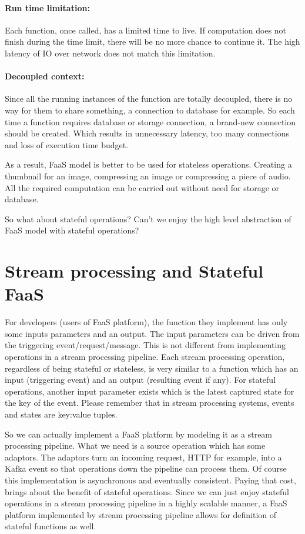 \documentclass[a4]{report}
\begin{document}
    \paragraph{Run time limitation:} Each function, once called, has a limited time to live.
    If computation does not finish during the time limit, there will be no more chance to continue it.
    The high latency of IO over network does not match this limitation.

    \paragraph{Decoupled context:} Since all the running instances of the function are totally decoupled, there is
    no way for them to share something, a connection to database for example.
    So each time a function requires database or storage connection, a brand-new connection should be created.
    Which results in unnecessary latency, too many connections and loss of execution time budget.

    As a result, FaaS model is better to be used for stateless operations.
    Creating a thumbnail for an image, compressing an image or compressing a piece of audio.
    All the required computation can be carried out without need for storage or database.

    So what about stateful operations?
    Can't we enjoy the high level abstraction of FaaS model with stateful operations?


    \section{Stream processing and Stateful FaaS}
    For developers (users of FaaS platform), the function they implement has only some inputs parameters and an output.
    The input parameters can be driven from the triggering event/request/message.
    This is not different from implementing operations in a stream processing pipeline.
    Each stream processing operation, regardless of being stateful or stateless, is very similar to a function which
    has an input (triggering event) and an output (resulting event if any).
    For stateful operations, another input parameter exists which is the latest captured state for the key of the event.
    Please remember that in stream processing systems, events and states are key:value tuples.

    So we can actually implement a FaaS platform by modeling it as a stream processing pipeline.
    What we need is a source operation which has some adaptors.
    The adaptors turn an incoming request, HTTP for example, into a Kafka event so that operations down the pipeline
    can process them.
    Of course this implementation is asynchronous and eventually consistent.
    Paying that cost, brings about the benefit of stateful operations.
    Since we can just enjoy stateful operations in a stream processing pipeline in a highly scalable manner,
    a FaaS platform implemented by stream processing pipeline allows for definition of stateful functions as well.
\end{document}
